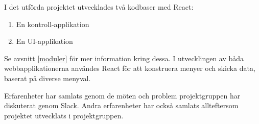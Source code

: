 I det utförda projektet utvecklades två kodbaser med React:

\begin{enumerate}
    \item En kontroll-applikation
    \item En UI-applikation
\end{enumerate} 

Se avsnitt \ref{moduler} för mer information kring dessa. I utvecklingen av båda webbapplikationerna användes React för att konstruera menyer och skicka data, baserat på diverse menyval.

Erfarenheter har samlats genom de möten och problem projektgruppen har diskuterat genom Slack. Andra erfarenheter har också samlats allteftersom projektet utvecklats i projektgruppen.



